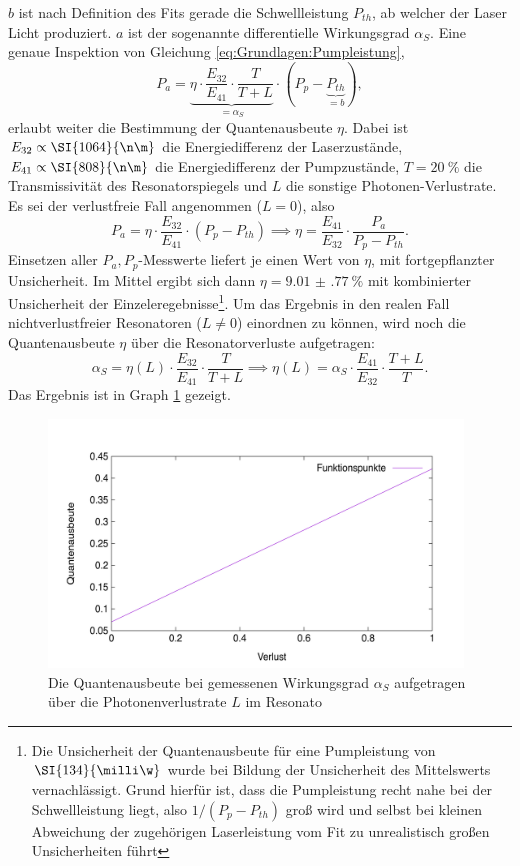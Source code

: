 \documentclass[../../../main.tex]{subfiles}
\begin{document}
    $b$ ist nach Definition des Fits gerade die Schwellleistung $P_{th}$, ab welcher der Laser Licht produziert. $a$ ist der sogenannte differentielle Wirkungsgrad $\alpha_S$. Eine genaue Inspektion von Gleichung \eqref{eq:Grundlagen:Pumpleistung},
    \[
        P_a = \underbrace{\eta\cdot\frac{E_{32}}{E_{41}}\cdot \frac{T}{T + L}}_{=\alpha_S}\cdot(P_p - \underbrace{P_{th}}_{=b}),
    \]
    erlaubt weiter die Bestimmung der Quantenausbeute $\eta$. Dabei ist $E_{32} \propto \SI{1064}{\n\m}$ die Energiedifferenz der Laserzustände, $E_{41} \propto \SI{808}{\n\m}$ die Energiedifferenz der Pumpzustände, $T=\SI{20}{\percent}$ die Transmissivität des Resonatorspiegels und $L$ die sonstige Photonen-Verlustrate. Es sei der verlustfreie Fall angenommen ($L=0$), also 
    \[
        P_a = \eta\cdot\frac{E_{32}}{E_{41}}\cdot(P_p - P_{th}) \implies \eta = \frac{E_{41}}{E_{32}}\cdot \frac{P_a}{P_p - P_{th}}.
    \] 
    Einsetzen aller $P_a, P_p$-Messwerte liefert je einen Wert von $\eta$, mit fortgepflanzter Unsicherheit. Im Mittel ergibt sich dann $\eta = \SI{9.01(77)}{\percent}$ mit kombinierter Unsicherheit der Einzeleregebnisse\footnote{Die Unsicherheit der Quantenausbeute für eine Pumpleistung von $\SI{134}{\milli\w}$ wurde bei Bildung der Unsicherheit des Mittelswerts vernachlässigt. Grund hierfür ist, dass die Pumpleistung recht nahe bei der Schwellleistung liegt, also $1/ (P_p - P_{th})$ groß wird und selbst bei kleinen Abweichung der zugehörigen Laserleistung vom Fit zu unrealistisch großen Unsicherheiten führt}. Um das Ergebnis in den realen Fall nichtverlustfreier Resonatoren ($L\neq 0$) einordnen zu können, wird noch die Quantenausbeute $\eta$ über die Resonatorverluste aufgetragen:
    \[
        \alpha_S = \eta(L)\cdot\frac{E_{32}}{E_{41}}\cdot\frac{T}{T + L}\implies \eta(L) = \alpha_S\cdot\frac{E_{41}}{E_{32}}\cdot\frac{T + L}{T}.
    \]
    Das Ergebnis ist in Graph \ref{fig:Auswertung:5:VerlustAusbeute} gezeigt.

    \begin{figure}[H]
        \centering
        \includegraphics[width=11cm]{../../Bilddateien/5-1/VerlustAusbeute.png}
        \caption{Die Quantenausbeute bei gemessenen Wirkungsgrad $\alpha_S$ aufgetragen über die Photonenverlustrate $L$ im Resonato}
        \label{fig:Auswertung:5:VerlustAusbeute}
    \end{figure}
\end{document}
